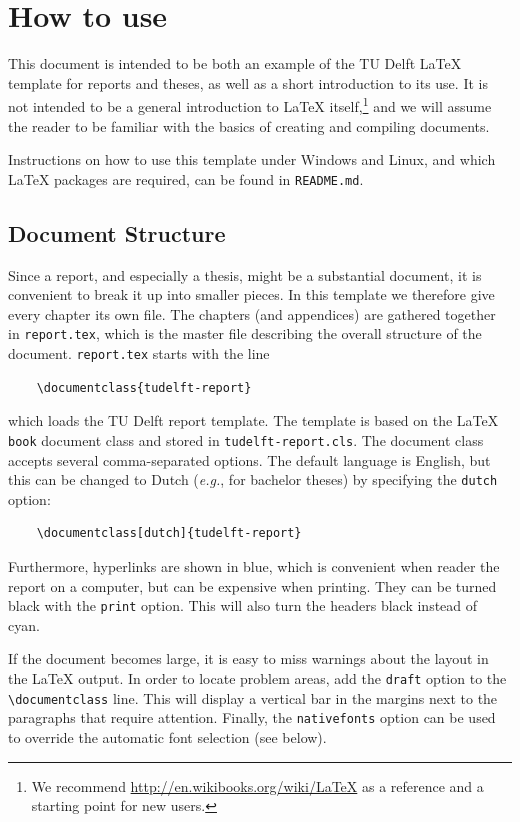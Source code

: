 \chapter{How to use}

This document is intended to be both an example of the TU Delft \LaTeX{} template for reports and theses, as well as a short introduction to its use. It is not intended to be a general introduction to \LaTeX{} itself,\footnote{We recommend \url{http://en.wikibooks.org/wiki/LaTeX} as a reference and a starting point for new users.} and we will assume the reader to be familiar with the basics of creating and compiling documents.

Instructions on how to use this template under Windows and Linux, and which \LaTeX{} packages are required, can be found in \texttt{README.md}.

\section{Document Structure}

Since a report, and especially a thesis, might be a substantial document, it is convenient to break it up into smaller pieces. In this template we therefore give every chapter its own file. The chapters (and appendices) are gathered together in \texttt{report.tex}, which is the master file describing the overall structure of the document. \texttt{report.tex} starts with the line
\begin{verbatim}
    \documentclass{tudelft-report}
\end{verbatim}
which loads the TU Delft report template. The template is based on the \LaTeX{} \texttt{book} document class and stored in \texttt{tudelft-report.cls}. The document class accepts several comma-separated options. The default language is English, but this can be changed to Dutch (\emph{e.g.}, for bachelor theses) by specifying the \texttt{dutch} option:
\begin{verbatim}
    \documentclass[dutch]{tudelft-report}
\end{verbatim}
Furthermore, hyperlinks are shown in blue, which is convenient when reader the report on a computer, but can be expensive when printing. They can be turned black with the \texttt{print} option. This will also turn the headers black instead of cyan.

If the document becomes large, it is easy to miss warnings about the layout in the \LaTeX{} output. In order to locate problem areas, add the \texttt{draft} option to the \verb|\documentclass| line. This will display a vertical bar in the margins next to the paragraphs that require attention. Finally, the \texttt{nativefonts} option can be used to override the automatic font selection (see below).

